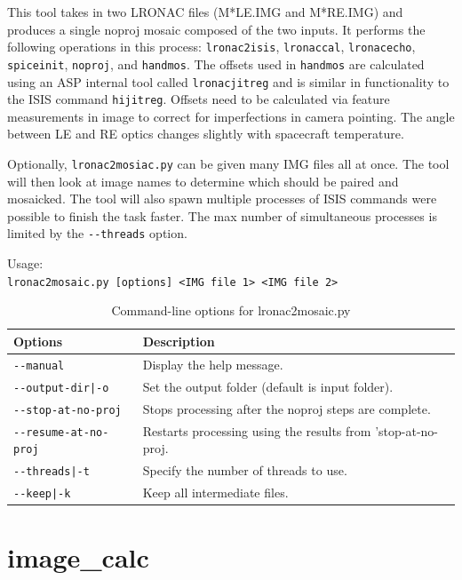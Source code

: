 This tool takes in two LRONAC files (M*LE.IMG and M*RE.IMG) and
produces a single noproj mosaic composed of the two inputs.  It
performs the following operations in this process:
\texttt{lronac2isis}, \texttt{lronaccal}, \texttt{lronacecho},
\texttt{spiceinit}, \texttt{noproj}, and \texttt{handmos}. The offsets
used in \texttt{handmos} are calculated using an ASP internal tool
called \texttt{lronacjitreg} and is similar in functionality to the
ISIS command \texttt{hijitreg}. Offsets need to be calculated via
feature measurements in image to correct for imperfections in camera
pointing. The angle between LE and RE optics changes slightly with
spacecraft temperature.

Optionally, \texttt{lronac2mosiac.py} can be given many IMG files all
at once. The tool will then look at image names to determine which
should be paired and mosaicked. The tool will also spawn multiple
processes of ISIS commands were possible to finish the task
faster. The max number of simultaneous processes is limited by the
\texttt{-\/-threads} option.

\medskip

Usage:\\
\hspace*{2em}\texttt{lronac2mosaic.py [options] <IMG file 1> <IMG file 2>}

\medskip

\begin{longtable}{|l|p{10cm}|}
\caption{Command-line options for lronac2mosaic.py}
\label{tbl:lronac2mosaic}
\endfirsthead
\endhead
\endfoot
\endlastfoot
\hline
Options & Description \\ \hline \hline
\texttt{-\/-manual} & Display the help message.\\ \hline
\texttt{-\/-output-dir|-o} & Set the output folder (default is input folder).\\ \hline
\texttt{-\/-stop-at-no-proj} & Stops processing after the noproj steps are complete. \\ \hline
\texttt{-\/-resume-at-no-proj} & Restarts processing using the results from 'stop-at-no-proj. \\ \hline
\texttt{-\/-threads|-t} & Specify the number of threads to use.\\ \hline
\texttt{-\/-keep|-k} & Keep all intermediate files.\\ \hline
\end{longtable}


\section{image\_calc}
\label{imagecalc}

